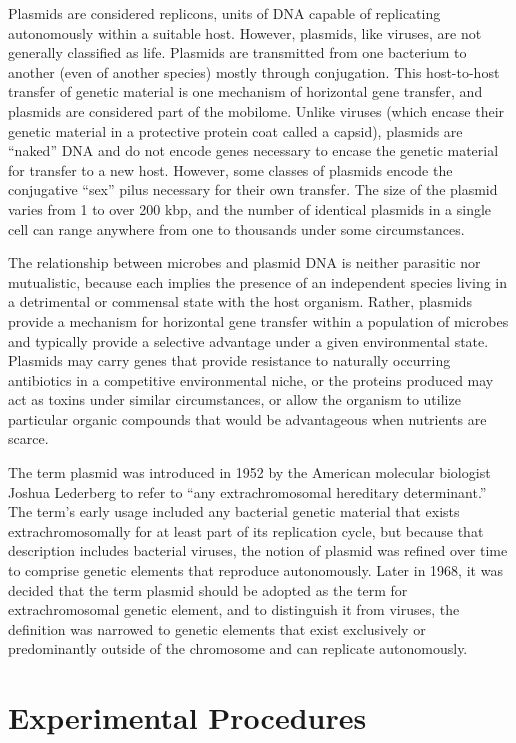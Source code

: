 \documentclass[]{book}
\begin{document}
Plasmids are considered replicons, units of DNA capable of replicating autonomously within a suitable host. However, plasmids, like viruses, are not generally classified as life. Plasmids are transmitted from one bacterium to another (even of another species) mostly through conjugation. This host-to-host transfer of genetic material is one mechanism of horizontal gene transfer, and plasmids are considered part of the mobilome. Unlike viruses (which encase their genetic material in a protective protein coat called a capsid), plasmids are ``naked'' DNA and do not encode genes necessary to encase the genetic material for transfer to a new host. However, some classes of plasmids encode the conjugative ``sex'' pilus necessary for their own transfer. The size of the plasmid varies from 1 to over 200 kbp, and the number of identical plasmids in a single cell can range anywhere from one to thousands under some circumstances.

The relationship between microbes and plasmid DNA is neither parasitic nor mutualistic, because each implies the presence of an independent species living in a detrimental or commensal state with the host organism. Rather, plasmids provide a mechanism for horizontal gene transfer within a population of microbes and typically provide a selective advantage under a given environmental state. Plasmids may carry genes that provide resistance to naturally occurring antibiotics in a competitive environmental niche, or the proteins produced may act as toxins under similar circumstances, or allow the organism to utilize particular organic compounds that would be advantageous when nutrients are scarce.

The term plasmid was introduced in 1952 by the American molecular biologist Joshua Lederberg to refer to ``any extrachromosomal hereditary determinant.'' The term's early usage included any bacterial genetic material that exists extrachromosomally for at least part of its replication cycle, but because that description includes bacterial viruses, the notion of plasmid was refined over time to comprise genetic elements that reproduce autonomously. Later in 1968, it was decided that the term plasmid should be adopted as the term for extrachromosomal genetic element, and to distinguish it from viruses, the definition was narrowed to genetic elements that exist exclusively or predominantly outside of the chromosome and can replicate autonomously.

\hypertarget{experimental-procedures-16}{%
\section{Experimental Procedures}\label{experimental-procedures-16}}
\end{document}
